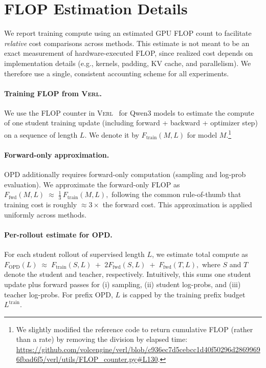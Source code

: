 \documentclass[11pt]{article}
\begin{document}
\section{FLOP Estimation Details}  
\label{appendix: flop}  
  
We report training compute using an estimated GPU FLOP count to facilitate \emph{relative} cost comparisons across methods. This estimate is not meant to be an exact measurement of hardware-executed FLOP, since realized cost depends on implementation details (e.g., kernels, padding, KV cache, and parallelism). We therefore use a single, consistent accounting scheme for all experiments.  
  
\paragraph{Training FLOP from \textsc{Verl}.}  
We use the FLOP counter in \textsc{Verl}~\cite{sheng2024hybridflow} for Qwen3 models to estimate the compute of one student training update (including forward + backward + optimizer step) on a sequence of length $L$. We denote it by $F_{\text{train}}(M,L)$ for model $M$.\footnote{We slightly modified the reference code to return cumulative FLOP (rather than a rate) by removing the division by elapsed time:  
\url{https://github.com/volcengine/verl/blob/c936ec7d5cebcc1d40f50296d28699696fbad6f5/verl/utils/FLOP_counter.py\#L130}.}  
  
\paragraph{Forward-only approximation.}  
OPD additionally requires forward-only computation (sampling and log-prob evaluation). We approximate the forward-only FLOP as  
$  
F_{\text{fwd}}(M,L) \;\approx\; \frac{1}{3}\,F_{\text{train}}(M,L),  
$  
following the common rule-of-thumb that training cost is roughly $\approx 3\times$ the forward cost. This approximation is applied uniformly across methods.  
  
\paragraph{Per-rollout estimate for OPD.}  
For each student rollout of supervised length $L$, we estimate total compute as  
$  
F_{\text{OPD}}(L)\;\approx\;  
F_{\text{train}}(S,L)\;+\;2F_{\text{fwd}}(S,L)\;+\;F_{\text{fwd}}(T,L),  
$  
where $S$ and $T$ denote the student and teacher, respectively. Intuitively, this sums one student update plus forward passes for (i) sampling, (ii) student log-probs, and (iii) teacher log-probs. For prefix OPD, $L$ is capped by the training prefix budget $L^{\text{train}}$.  
  
\end{document}
